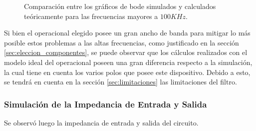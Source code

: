 \documentclass[a4paper]{article}
\begin{document}
\begin{figure}[H]
\begin{subfigure}[t]{0.49\textwidth}
	\end{subfigure}
	\label{fig:bode_calc_sim_highf}
	\caption{Comparación entre los gráficos de bode simulados y calculados teóricamente para las frecuencias mayores a $100KHz$.}
\end{figure}

Si bien el operacional elegido posee un gran ancho de banda para mitigar lo más posible estos problemas a las altas frecuencias, como justificado en la sección \ref{sec:eleccion_componentes}, se puede observar que los cálculos realizados con el modelo ideal del operacional poseen una gran diferencia respecto a la simulación, la cual tiene en cuenta los varios polos que posee este dispositivo. Debido a esto, se tendrá en cuenta en la sección \ref{sec:limitaciones} las limitaciones del filtro.

\subsubsection{Simulación de la Impedancia de Entrada y Salida}

Se observó luego la impedancia de entrada y salida del circuito.
\end{document}
